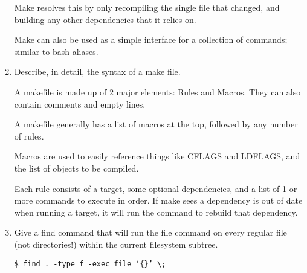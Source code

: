 \documentclass[letterpaper,10pt]{article}
\begin{document}
\begin{enumerate}
Make resolves this by only recompiling the single file that changed, and
building any other dependencies that it relies on.

Make can also be used as a simple interface for a collection of
commands; similar to bash aliases.

\item Describe, in detail, the syntax of a make file.

A makefile is made up of 2 major elements: Rules and Macros. They can
also contain comments and empty lines.

A makefile generally has a list of macros at the top, followed by any
number of rules.

Macros are used to easily reference things like CFLAGS and LDFLAGS, and
the list of objects to be compiled.

Each rule consists of a target, some optional dependencies, and a list
of 1 or more commands to execute in order. If make sees a dependency is
out of date when running a target, it will run the command to rebuild
that dependency. 

\item Give a find command that will run the file command on every
      regular file (not directories!) within the current filesystem
      subtree.

\texttt{\$ find . -type f -exec file `\{\}' \textbackslash;}

\end{enumerate}
\end{document}
